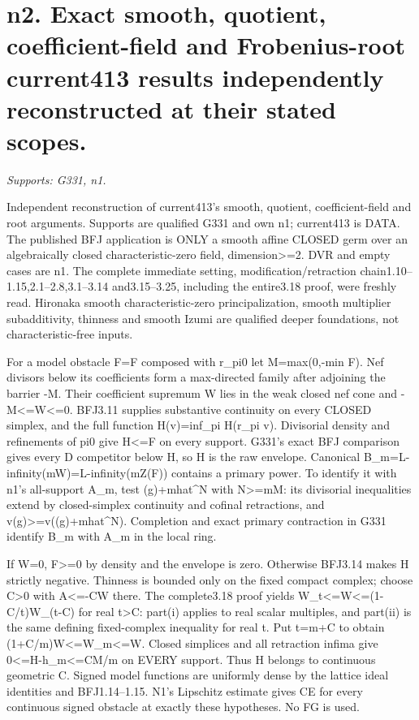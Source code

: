 \section{n2. Exact smooth, quotient, coefficient-field and Frobenius-root current413 results independently reconstructed at their stated scopes.}
\textit{Supports: G331, n1.}

Independent reconstruction of current413's smooth, quotient, coefficient-field and root arguments. Supports are qualified G331 and own n1; current413 is DATA. The published BFJ application is ONLY a smooth affine CLOSED germ over an algebraically closed characteristic-zero field, dimension>=2. DVR and empty cases are n1. The complete immediate setting, modification/retraction chain1.10--1.15,2.1--2.8,3.1--3.14 and3.15--3.25, including the entire3.18 proof, were freshly read. Hironaka smooth characteristic-zero principalization, smooth multiplier subadditivity, thinness and smooth Izumi are qualified deeper foundations, not characteristic-free inputs.

For a model obstacle F=F composed with r\_pi0 let M=max(0,-min F). Nef divisors below its coefficients form a max-directed family after adjoining the barrier -M. Their coefficient supremum W lies in the weak closed nef cone and -M<=W<=0. BFJ3.11 supplies substantive continuity on every CLOSED simplex, and the full function H(v)=inf\_pi H(r\_pi v). Divisorial density and refinements of pi0 give H<=F on every support. G331's exact BFJ comparison gives every D competitor below H, so H is the raw envelope. Canonical B\_m=L-infinity(mW)=L-infinity(mZ(F)) contains a primary power. To identify it with n1's all-support A\_m, test (g)+mhat\textasciicircum{}N with N>=mM: its divisorial inequalities extend by closed-simplex continuity and cofinal retractions, and v(g)>=v((g)+mhat\textasciicircum{}N). Completion and exact primary contraction in G331 identify B\_m with A\_m in the local ring.

If W=0, F>=0 by density and the envelope is zero. Otherwise BFJ3.14 makes H strictly negative. Thinness is bounded only on the fixed compact complex; choose C>0 with A<=-CW there. The complete3.18 proof yields W\_t<=W<=(1-C/t)W\_(t-C) for real t>C: part(i) applies to real scalar multiples, and part(ii) is the same defining fixed-complex inequality for real t. Put t=m+C to obtain (1+C/m)W<=W\_m<=W. Closed simplices and all retraction infima give 0<=H-h\_m<=CM/m on EVERY support. Thus H belongs to continuous geometric C. Signed model functions are uniformly dense by the lattice ideal identities and BFJ1.14--1.15. N1's Lipschitz estimate gives CE for every continuous signed obstacle at exactly these hypotheses. No FG is used.

